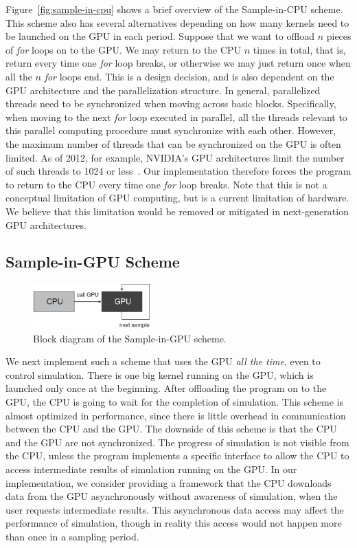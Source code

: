 \documentclass[times, 10pt, twocolumn]{article}
\begin{document}
Figure~\ref{fig:sample-in-cpu} shows a brief overview of the
Sample-in-CPU scheme.
This scheme also has several alternatives depending on how many kernels
need to be launched on the GPU in each period. 
Suppose that we want to offload $n$ pieces of \textit{for} loops on to
the GPU.
We may return to the CPU $n$ times in total, that is, return every time
one \textit{for} loop breaks, or otherwise we may just return once when
all the $n$ \textit{for} loops end.
This is a design decision, and is also dependent on the GPU architecture
and the parallelization structure.
In general, parallelized threads need to be synchronized when moving
across basic blocks.
Specifically, when moving to the next \textit{for} loop executed in
parallel, all the threads relevant to this parallel computing procedure
must synchronize with each other.
However, the maximum number of threads that can be synchronized on the
GPU is often limited.
As of 2012, for example, NVIDIA's GPU architectures limit the number of
such threads to 1024 or less~\cite{NVIDIA_Kepler}.
Our implementation therefore forces the program to return to the CPU
every time one \textit{for} loop breaks.
Note that this is not a conceptual limitation of GPU computing, but is a
current limitation of hardware.
We believe that this limitation would be removed or mitigated in
next-generation GPU architectures.

\subsection{Sample-in-GPU Scheme}
\label{sec:sample-in-gpu}

\begin{figure}[t]
\centering
\includegraphics[width=0.4\textwidth]{eps/sample-in-gpu.eps}
\caption{Block diagram of the Sample-in-GPU scheme.}
\label{fig:sample-in-gpu}
\end{figure}

We next implement such a scheme that uses the GPU \textit{all the time},
even to control simulation.
There is one big kernel running on the GPU, which is launched only once
at the beginning.
After offloading the program on to the GPU, the CPU is going to wait for
the completion of simulation.
This scheme is almost optimized in performance, since there is little
overhead in communication between the CPU and the GPU.
The downside of this scheme is that the CPU and the GPU are not
synchronized.
The progress of simulation is not visible from the CPU, unless the
program implements a specific interface to allow the CPU to access
intermediate results of simulation running on the GPU.
In our implementation, we consider providing a framework that the CPU
downloads data from the GPU asynchronously without awareness of
simulation, when the user requests intermediate results.
This asynchronous data access may affect the performance of simulation,
though in reality this access would not happen more than once in a
sampling period.
\end{document}
